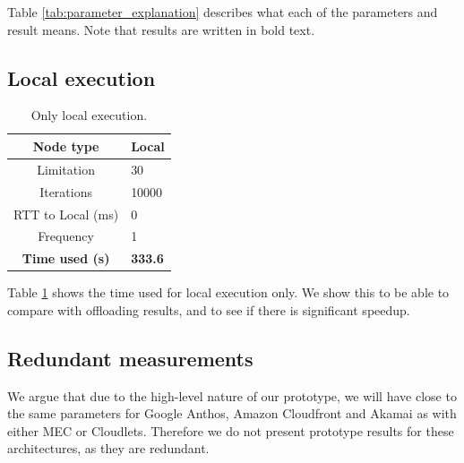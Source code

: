 Table \ref{tab:parameter_explanation} describes what each of the parameters and result means. Note that results are written in bold text.


\subsection{Local execution}
\begin{table}[h!]
    \centering
    \begin{tabular}[c]{|c||p{2cm}|}
        \hline
        Node type & Local \\
        \hline
        Limitation          & 30  \\
        \hline
        Iterations          & 10000  \\
        \hline
        RTT to Local (ms)   & 0  \\
        \hline
        Frequency           & 1 \\
        \hline
        \hline
        \hline
        \textbf{Time used (s)} & \textbf{333.6} \\
        \hline
    \end{tabular}
    \caption{Only local execution.}
    \label{tab:local_execution}
\end{table}
Table \ref{tab:local_execution} shows the time used for local execution only. We show this to be able to compare with offloading results, and to see if there is significant speedup.

\subsection{Redundant measurements}
We argue that due to the high-level nature of our prototype, we will have close to the same parameters for Google Anthos, Amazon Cloudfront and Akamai as with either MEC or Cloudlets. Therefore we do not present prototype results for these architectures, as they are redundant.




















